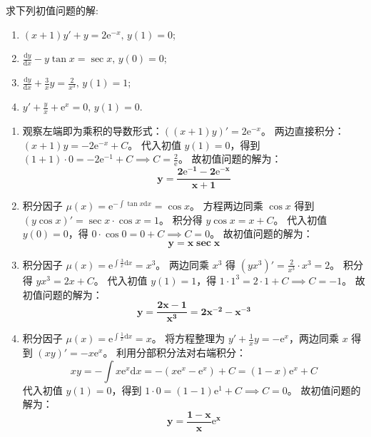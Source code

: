 \documentclass[lang=cn,11pt]{elegantbook}
\begin{document}
\begin{exercise}[一阶线性微分方程初值问题]
求下列初值问题的解:
\begin{enumerate}
    \item[(1)] $\displaystyle (x+1)y' + y = 2\mathrm{e}^{-x},\,y(1)=0$;
    \item[(2)] $\displaystyle \frac{\mathrm{d}y}{\mathrm{d}x} - y\tan x = \sec x,\,y(0)=0$;
    \item[(3)] $\displaystyle \frac{\mathrm{d}y}{\mathrm{d}x} + \frac{3}{x}y = \frac{2}{x^3},\,y(1)=1$;
    \item[(4)] $\displaystyle y' + \frac{y}{x} + \mathrm{e}^x = 0,\,y(1)=0$.
\end{enumerate}
\end{exercise}
\begin{solution}
\begin{enumerate}
    \item[(1)]观察左端即为乘积的导数形式：$((x+1)y)' = 2\mathrm{e}^{-x}$。
两边直接积分：$(x+1)y = -2\mathrm{e}^{-x} + C$。
代入初值 $y(1)=0$，得到 $(1+1)\cdot 0 = -2\mathrm{e}^{-1} + C \implies C = \frac{2}{\mathrm{e}}$。
故初值问题的解为：
\[
\mathbf{y = \frac{2\mathrm{e}^{-1} - 2\mathrm{e}^{-x}}{x+1}}
\]
\item[(2)]积分因子 $\mu(x) = \mathrm{e}^{-\int \tan x\mathrm{d}x} = \cos x$。
方程两边同乘 $\cos x$ 得到 $(y\cos x)' = \sec x \cdot \cos x = 1$。
积分得 $y\cos x = x + C$。
代入初值 $y(0)=0$，得 $0\cdot \cos 0 = 0 + C \implies C = 0$。
故初值问题的解为：
\[
\mathbf{y = x\sec x}
\]
\item[(3)]积分因子 $\mu(x) = \mathrm{e}^{\int \frac{3}{x}\mathrm{d}x} = x^3$。
两边同乘 $x^3$ 得 $(y x^3)' = \frac{2}{x^3} \cdot x^3 = 2$。
积分得 $yx^3 = 2x + C$。
代入初值 $y(1)=1$，得 $1\cdot 1^3 = 2\cdot 1 + C \implies C = -1$。
故初值问题的解为：
\[
\mathbf{y = \frac{2x - 1}{x^3} = 2x^{-2} - x^{-3}}
\]
\item[(4)]积分因子 $\mu(x) = \mathrm{e}^{\int \frac{1}{x}\mathrm{d}x} = x$。
将方程整理为 $y' + \frac{1}{x}y = -\mathrm{e}^x$，两边同乘 $x$ 得到 $(xy)' = -x\mathrm{e}^x$。
利用分部积分法对右端积分：
\[
xy = -\int x\mathrm{e}^x\mathrm{d}x = -(x\mathrm{e}^x - \mathrm{e}^x) + C = (1-x)\mathrm{e}^x + C
\]
代入初值 $y(1)=0$，得到 $1\cdot 0 = (1-1)\mathrm{e}^1 + C \implies C=0$。
故初值问题的解为：
\[
\mathbf{y = \frac{1-x}{x}\mathrm{e}^x}
\]
\end{enumerate}
\end{solution}
\end{document}
